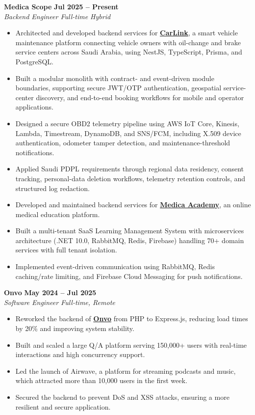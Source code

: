 \documentclass[letterpaper, 11pt]{article}
\begin{document}
\textbf{Medica Scope} \hfill \textbf{Jul 2025 -- Present} \\
\textit{Backend Engineer \textbar{} Full-time Hybrid}
\begin{itemize}[leftmargin=1.5em, nosep, itemsep=0.1em]
  \item Architected and developed backend services for \href{https://carlink.dev/}{\textbf{CarLink}}, a smart vehicle maintenance platform connecting vehicle owners with oil-change and brake service centers across Saudi Arabia, using NestJS, TypeScript, Prisma, and PostgreSQL.
  \item Built a modular monolith with contract- and event-driven module boundaries, supporting secure JWT/OTP authentication, geospatial service-center discovery, and end-to-end booking workflows for mobile and operator applications.
  \item Designed a secure OBD2 telemetry pipeline using AWS IoT Core, Kinesis, Lambda, Timestream, DynamoDB, and SNS/FCM, including X.509 device authentication, odometer tamper detection, and maintenance-threshold notifications.
  \item Applied Saudi PDPL requirements through regional data residency, consent tracking, personal-data deletion workflows, telemetry retention controls, and structured log redaction.
  \item Developed and maintained backend services for \href{https://medicaacademy.com/}{\textbf{Medica Academy}}, an online medical education platform.
  \item Built a multi-tenant SaaS Learning Management System with microservices architecture (.NET 10.0, RabbitMQ, Redis, Firebase) handling 70+ domain services with full tenant isolation.
  \item Implemented event-driven communication using RabbitMQ, Redis caching/rate limiting, and Firebase Cloud Messaging for push notifications.
\end{itemize}



\textbf{Onvo} \hfill \textbf{May 2024 -- Jul 2025} \\
\textit{Software Engineer \textbar{} Full-time, Remote}
\begin{itemize}[leftmargin=1.5em, nosep, itemsep=0.1em]
  \item Reworked the backend of \href{https://onvo.me/}{\textbf{Onvo}} from PHP to Express.js, reducing load times by 20\% and improving system stability.
   \item Built and scaled a large Q/A platform serving 150{,}000+ users with real-time interactions and high concurrency support.
  \item Led the launch of Airwave, a platform for streaming podcasts and music, which attracted more than 10,000 users in the first week.
  \item Secured the backend to prevent DoS and XSS attacks, ensuring a more resilient and secure application.
\end{itemize}
\end{document}
